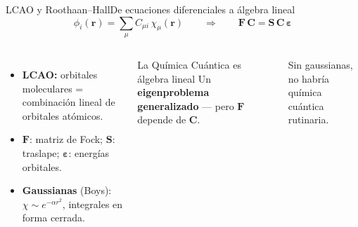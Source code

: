 \documentclass[aspectratio=169]{beamer}
\newcommand{\cplx}[1]{{\footnotesize\color{cookieMuted}#1}}
\newcommand{\vr}{\mathbf{r}}
\begin{document}
\begin{frame}{LCAO y Roothaan--Hall}{De ecuaciones diferenciales a álgebra lineal}
  \[ \phi_i(\vr)=\sum_{\mu}C_{\mu i}\,\chi_\mu(\vr) \qquad\Longrightarrow\qquad \mathbf{F}\,\mathbf{C}=\mathbf{S}\,\mathbf{C}\,\boldsymbol{\varepsilon} \]
  \vspace{.2em}
  \begin{columns}[T,onlytextwidth]
      \begin{itemize}\setlength\itemsep{4pt}
        \item \textbf{LCAO:} orbitales moleculares = combinación lineal de orbitales atómicos.
        \item $\mathbf F$: matriz de Fock; $\mathbf S$: traslape; $\boldsymbol\varepsilon$: energías orbitales.
        \item \textbf{Gaussianas} (Boys): $\chi\sim e^{-\alpha r^{2}}$, integrales en forma cerrada.
      \end{itemize}
      \begin{exampleblock}{La Química Cuántica es álgebra lineal}
        Un \textbf{eigenproblema generalizado} --- pero $\mathbf F$ depende de $\mathbf C$.
      \end{exampleblock}
      \cplx{Sin gaussianas, no habría química cuántica rutinaria.}
  \end{columns}
\end{frame}
\end{document}
